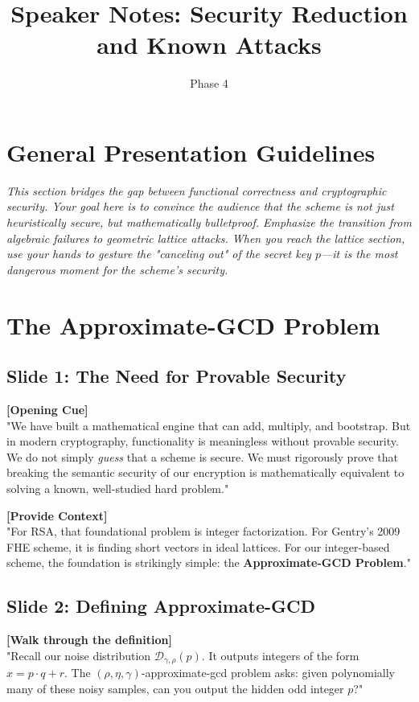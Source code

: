 \documentclass[11pt]{article}
\title{Speaker Notes: Security Reduction and Known Attacks}
\author{Phase 4}
\date{}
\begin{document}
\maketitle

\section*{General Presentation Guidelines}
\textit{This section bridges the gap between functional correctness and cryptographic security. Your goal here is to convince the audience that the scheme is not just heuristically secure, but mathematically bulletproof. Emphasize the transition from algebraic failures to geometric lattice attacks. When you reach the lattice section, use your hands to gesture the "canceling out" of the secret key $p$---it is the most dangerous moment for the scheme's security.}

\hrulefill

\section{The Approximate-GCD Problem}

\subsection*{Slide 1: The Need for Provable Security}
\textbf{[Opening Cue]} \\
"We have built a mathematical engine that can add, multiply, and bootstrap. But in modern cryptography, functionality is meaningless without provable security. We do not simply \textit{guess} that a scheme is secure. We must rigorously prove that breaking the semantic security of our encryption is mathematically equivalent to solving a known, well-studied hard problem."

\textbf{[Provide Context]} \\
"For RSA, that foundational problem is integer factorization. For Gentry's 2009 FHE scheme, it is finding short vectors in ideal lattices. For our integer-based scheme, the foundation is strikingly simple: the \textbf{Approximate-GCD Problem}."

\subsection*{Slide 2: Defining Approximate-GCD}
\textbf{[Walk through the definition]} \\
"Recall our noise distribution $\mathcal{D}_{\gamma,\rho}(p)$. It outputs integers of the form $x = p \cdot q + r$. The $(\rho, \eta, \gamma)$-approximate-gcd problem asks: given polynomially many of these noisy samples, can you output the hidden odd integer $p$?"
\end{document}
